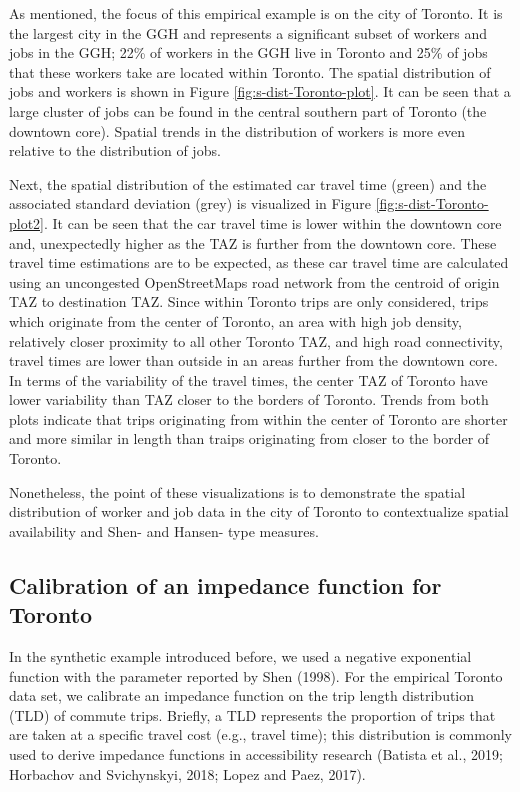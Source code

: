 \documentclass[]{elsarticle} %
\begin{document}
As mentioned, the focus of this empirical example is on the city of
Toronto. It is the largest city in the GGH and represents a significant
subset of workers and jobs in the GGH; 22\% of workers in the GGH live
in Toronto and 25\% of jobs that these workers take are located within
Toronto. The spatial distribution of jobs and workers is shown in Figure
\ref{fig:s-dist-Toronto-plot}. It can be seen that a large cluster of
jobs can be found in the central southern part of Toronto (the downtown
core). Spatial trends in the distribution of workers is more even
relative to the distribution of jobs.

Next, the spatial distribution of the estimated car travel time (green)
and the associated standard deviation (grey) is visualized in Figure
\ref{fig:s-dist-Toronto-plot2}. It can be seen that the car travel time
is lower within the downtown core and, unexpectedly higher as the TAZ is
further from the downtown core. These travel time estimations are to be
expected, as these car travel time are calculated using an uncongested
OpenStreetMaps road network from the centroid of origin TAZ to
destination TAZ. Since within Toronto trips are only considered, trips
which originate from the center of Toronto, an area with high job
density, relatively closer proximity to all other Toronto TAZ, and high
road connectivity, travel times are lower than outside in an areas
further from the downtown core. In terms of the variability of the
travel times, the center TAZ of Toronto have lower variability than TAZ
closer to the borders of Toronto. Trends from both plots indicate that
trips originating from within the center of Toronto are shorter and more
similar in length than traips originating from closer to the border of
Toronto.

Nonetheless, the point of these visualizations is to demonstrate the
spatial distribution of worker and job data in the city of Toronto to
contextualize spatial availability and Shen- and Hansen- type measures.

\hypertarget{calibration-of-an-impedance-function-for-toronto}{%
\subsection{Calibration of an impedance function for
Toronto}\label{calibration-of-an-impedance-function-for-toronto}}

In the synthetic example introduced before, we used a negative
exponential function with the parameter reported by Shen (1998). For the
empirical Toronto data set, we calibrate an impedance function on the
trip length distribution (TLD) of commute trips. Briefly, a TLD
represents the proportion of trips that are taken at a specific travel
cost (e.g., travel time); this distribution is commonly used to derive
impedance functions in accessibility research (Batista et al., 2019;
Horbachov and Svichynskyi, 2018; Lopez and Paez, 2017).
\end{document}
